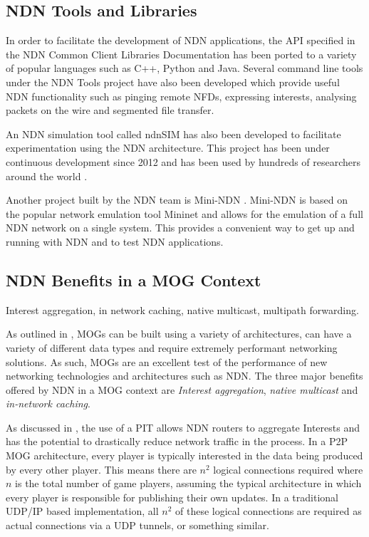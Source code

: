\subsection{NDN Tools and Libraries}\label{sec:ndn-tools}
In order to facilitate the development of NDN applications, the API specified in the NDN Common Client Libraries Documentation \cite{ndn-ccl} has been ported to a variety of popular languages such as C++, Python and Java. Several command line tools under the NDN Tools project \cite{ndn-tools} have also been developed which provide useful NDN functionality such as pinging remote NFDs, expressing interests, analysing packets on the wire and segmented file transfer.

An NDN simulation tool called ndnSIM \cite{ndn-sim-webpage} has also been developed to facilitate experimentation using the NDN architecture. This project has been under continuous development since 2012 and has been used by hundreds of researchers around the world \cite{ndnsim}.  

Another project built by the NDN team is Mini-NDN \cite{mini-ndn}. Mini-NDN is based on the popular network emulation tool Mininet \cite{mininet} and allows for the emulation of a full NDN network on a single system. This provides a convenient way to get up and running with NDN and to test NDN applications.





\subsection{NDN Benefits in a MOG Context}\label{sec:sota:mog-ndn-benefits}
Interest aggregation, in network caching, native multicast, multipath forwarding.

As outlined in , MOGs can be built using a variety of architectures, can have a variety of different data types and require extremely performant networking solutions. As such, MOGs are an excellent test of the performance of new networking technologies and architectures such as NDN. The three major benefits offered by NDN in a MOG context are \textit{Interest aggregation}, \textit{native multicast} and \textit{in-network caching}.

As discussed in , the use of a PIT allows NDN routers to aggregate Interests and has the potential to drastically reduce network traffic in the process. In a P2P MOG architecture, every player is typically interested in the data being produced by every other player. This means there are $n^2$ logical connections required where $n$ is the total number of game players, assuming the typical architecture in which every player is responsible for publishing their own updates. In a traditional UDP/IP based implementation, all $n^2$ of these logical connections are required as actual connections via a UDP tunnels, or something similar.

